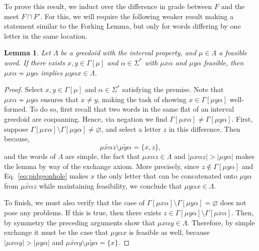 \documentclass[11pt]{article}
\newtheorem{lemma}[theorem]{Lemma}
\newcommand{\univ}{\Sigma}
\newcommand{\glang}{\Lambda}
\begin{document}
To prove this result, we induct over the difference in grade between $F$ and the meet $F\sqcap F'$.
For this, we will require the following weaker result making a statement similar to the Forking Lemma, but only for words differing by one letter in the same location.
\begin{lemma}\label{lem:inner-forking}
    Let $\glang$ be a greedoid with the interval property, and $\mu \in \glang$ a feasible word.
    If there exists $x,y \in \Gamma[\mu]$ and $\alpha \in \univ^*$ with $\mu x \alpha$ and $\mu y \alpha$ feasible, then $\mu x \alpha \not\sim \mu y \alpha$ implies $\mu y \alpha x \in \glang$.
\end{lemma}
\begin{proof}
    Select $x,y \in \Gamma[\mu]$ and $\alpha \in \univ^*$ satisfying the premise.
    Note that $\mu x \alpha \not\sim \mu y \alpha$ ensures that $x \neq y$, making the task of showing $x \in \Gamma[\mu y \alpha]$ well-formed.
    To do so, first recall that two words in the same flat of an interval greedoid are cospanning.
    Hence, via negation we find $\Gamma[\mu x \alpha] \neq \Gamma[\mu y \alpha]$.
    First, suppose $\Gamma[\mu x \alpha] \setminus \Gamma[\mu y \alpha] \neq \varnothing$, and select a letter $z$ in this difference.
    Then because,
    \begin{equation}\label{eq:pidgeonhole}
        \widetilde{\mu x \alpha z} \setminus \widetilde{\mu y \alpha} = \{x, z\},
    \end{equation}
    and the words of $\glang$ are simple, the fact that $\mu x \alpha z \in \glang$ and $|\mu x \alpha z| > |\mu y \alpha|$ makes the lemma by way of the exchange axiom.
    More precisely, since $z \notin \Gamma[\mu y \alpha]$ and Eq.~\ref{eq:pidgeonhole} makes $x$ the only letter that can be concatenated onto $\mu y \alpha$ from $\widetilde{\mu x \alpha z}$ while maintaining feasibility, we conclude that $\mu y \alpha x \in \glang$.
    
    To finish, we must also verify that the case of $\Gamma[\mu x\alpha]\setminus \Gamma[\mu y \alpha] = \varnothing$ does not pose any problems.
    If this is true, then there exists $z \in \Gamma[\mu y \alpha]\setminus \Gamma[\mu x \alpha]$.
    Then, by symmetry the preceding arguments show that $\mu x \alpha y \in \glang$.
    Therefore, by simple exchange it must be the case that $\mu y \alpha x$ is feasible as well, because $|\mu x \alpha y| > |\mu y \alpha|$ and $\widetilde{\mu x \alpha y} \setminus \widetilde{\mu y \alpha} = \{x\}$.
\end{proof}
\end{document}
